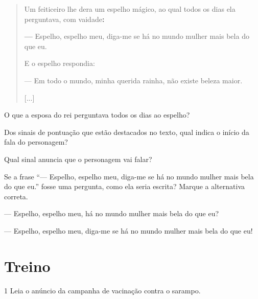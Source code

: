 \begin{quote}
Um feiticeiro lhe dera um espelho mágico, ao qual todos os dias ela
perguntava, com vaidade\textbf{:}

\textbf{---} Espelho, espelho meu, diga-me se há no mundo mulher mais bela do que
eu.

E o espelho respondia:

--- Em todo o mundo, minha querida rainha, não existe beleza maior.

{[}...{]}

\end{quote}

\begin{escolha}[itemsep=-5pt]
\item
  O que a esposa do rei perguntava todos os dias ao espelho?
\item{}

\item
  Dos sinais de pontuação que estão destacados no texto, qual indica o
  início da fala do personagem?
\item{}

\item
  Qual sinal anuncia que o personagem vai falar?
\item{}

\item Se a frase ``--- Espelho, espelho meu, diga-me se há no mundo mulher
mais bela do que eu.'' fosse uma pergunta, como ela seria escrita?
Marque a alternativa correta.

\begin{boxlist}
 --- Espelho, espelho meu, há no mundo mulher mais bela do que eu?

 --- Espelho, espelho meu, diga-me se há no mundo mulher mais bela do que eu!
\end{boxlist}
\end{escolha}

\section{Treino}

\num{1} Leia o anúncio da campanha de vacinação contra o sarampo.


